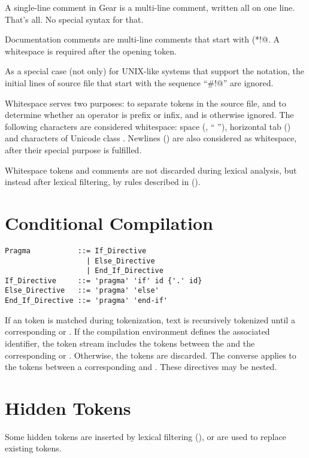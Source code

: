 A single-line comment in Gear is a multi-line comment, written all on one line. That's all. No special syntax for that. 

Documentation comments are multi-line comments that start with \lstinline@(*!@. A whitespace is required after the opening token. 

As a special case (not only) for UNIX-like systems that support the notation, the initial lines of source file that start with the sequence ``\lstinline@#!@'' are ignored. 

Whitespace serves two purposes: to separate tokens in the source file, and to determine whether an operator is prefix or infix, and is otherwise ignored. The following characters are considered whitespace: space (, `` ''), horizontal tab () and characters of Unicode class . Newlines () are also considered as whitespace, after their special purpose is fulfilled. 

Whitespace tokens and comments are not discarded during lexical analysis, but instead after lexical filtering, by rules described in ().





\section{Conditional Compilation}
\label{sec:conditional-compilation}

\syntax\begin{lstlisting}
Pragma           ::= If_Directive 
                   | Else_Directive 
                   | End_If_Directive 
If_Directive     ::= 'pragma' 'if' id {'.' id}
Else_Directive   ::= 'pragma' 'else'
End_If_Directive ::= 'pragma' 'end-if'
\end{lstlisting}

If an  token is matched during tokenization, text is recursively tokenized until a corresponding  or . If the compilation environment defines the associated identifier, the token stream includes the tokens between the  and the corresponding  or . Otherwise, the tokens are discarded. The converse applies to the tokens between a corresponding  and . These directives may be nested. 





\section{Hidden Tokens}
\label{sec:hidden-tokens}

Some hidden tokens are inserted by lexical filtering (), or are used to replace existing tokens. 





